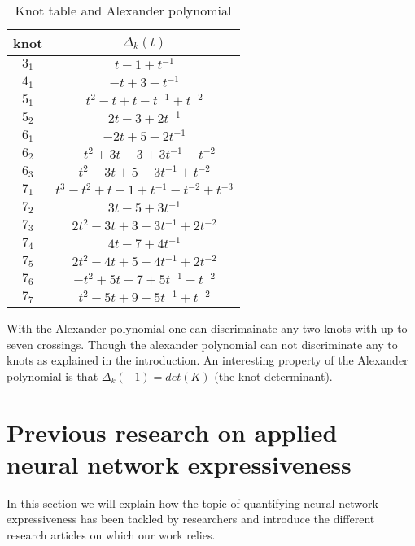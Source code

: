 \documentclass[12pt, a4paper]{article}
\begin{document}
\begin{table}[H]
\begin{center}
  \begin{tabular}{| c | c |}
    \hline
    knot & $\Delta_k(t)$\\
    \hline
    $3_1$ & $t - 1 + t^{-1}$\\
    \hline
    $4_1$ & $-t + 3 -t^{-1}$\\
    \hline
    $5_1$ & $t^2 - t + t - t^{-1} + t^{-2}$\\
    \hline
    $5_2$ & $2t - 3 + 2t^{-1}$\\
    \hline
    $6_1$ & $-2t + 5 -2t^{-1}$\\
    \hline
    $6_2$ & $-t^2 + 3t -3 + 3t^{-1} - t^{-2}$\\
    \hline
    $6_3$ & $t^2 - 3t +5 -3t^{-1} + t^{-2}$\\
    \hline
    $7_1$ & $t^3 - t^2 +t -1 + t^{-1} - t^{-2} + t^{-3}$\\
    \hline
    $7_2$ & $3t -5 + 3t^{-1}$\\
    \hline
    $7_3$ & $2t^2 - 3t + 3 - 3t^{-1} + 2t^{-2}$\\
    \hline
    $7_4$ & $4t -7 + 4t^{-1}$\\
    \hline
    $7_5$ & $2t^2 - 4t + 5 - 4t^{-1} + 2t^{-2}$\\
    \hline
    $7_6$ & $-t^2 +5t -7 +5t^{-1} - t^{-2}$\\
    \hline
    $7_7$ & $t^2 -5t +9 -5t^{-1} + t^{-2}$\\
    \hline
  \end{tabular}
\end{center}
  \caption{Knot table and Alexander polynomial}
\label{tab:knot_alexander}
\end{table}

With the Alexander polynomial one can discrimainate any two knots with up to seven crossings. Though the alexander polynomial can not discriminate any to knots as explained in the introduction. An interesting property of the Alexander polynomial is that $\Delta_k(-1) = det(K)$ (the knot determinant).

\newpage
\thispagestyle{empty}
\mbox{}
\newpage

\section{Previous research on applied neural network expressiveness}

In this section we will explain how the topic of quantifying neural network expressiveness has been tackled by researchers and introduce the different research articles on which our work relies.\\
\end{document}
